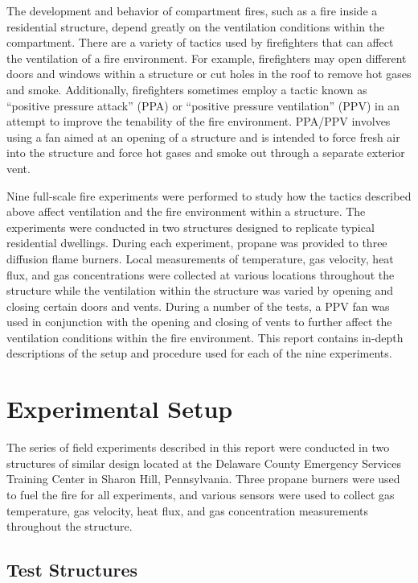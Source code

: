 \documentclass[12pt,oneside]{book}
\begin{document}
The development and behavior of compartment fires, such as a fire inside a residential structure, depend greatly on the ventilation conditions within the compartment. There are a variety of tactics used by firefighters that can affect the ventilation of a fire environment. For example, firefighters may open different doors and windows within a structure or cut holes in the roof to remove hot gases and smoke. Additionally, firefighters sometimes employ a tactic known as ``positive pressure attack'' (PPA) or ``positive pressure ventilation'' (PPV) in an attempt to improve the tenability of the fire environment. PPA/PPV involves using a fan aimed at an opening of a structure and is intended to force fresh air into the structure and force hot gases and smoke out through a separate exterior vent.

Nine full-scale fire experiments were performed to study how the tactics described above affect ventilation and the fire environment within a structure. The experiments were conducted in two structures designed to replicate typical residential dwellings. During each experiment, propane was provided to three diffusion flame burners. Local measurements of temperature, gas velocity, heat flux, and gas concentrations were collected at various locations throughout the structure while the ventilation within the structure was varied by opening and closing certain doors and vents. During a number of the tests, a PPV fan was used in conjunction with the opening and closing of vents to further affect the ventilation conditions within the fire environment. This report contains in-depth descriptions of the setup and procedure used for each of the nine experiments.


\chapter{Experimental Setup}
\label{chap:Experimental_Setup}
The series of field experiments described in this report were conducted in two structures of similar design located at the Delaware County Emergency Services Training Center in Sharon Hill, Pennsylvania. Three propane burners were used to fuel the fire for all experiments, and various sensors were used to collect gas temperature, gas velocity, heat flux, and gas concentration measurements throughout the structure.

\section{Test Structures}
\label{sec:Test_Structures}
\end{document}
